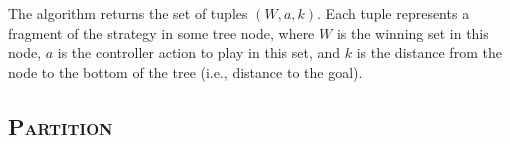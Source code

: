 %
%

The algorithm returns the set of tuples $(W, a, k)$.  Each tuple
represents a fragment of the strategy in some tree node, where $W$
is the winning set in this node, $a$ is the controller action to
play in this set, and $k$ is the distance from the node to the
bottom of the tree (i.e., distance to the goal).



\subsection{\textsc{Partition}}

